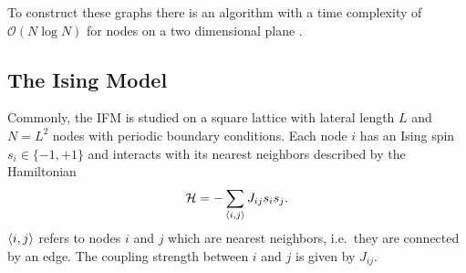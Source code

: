     To construct these graphs there is an algorithm with
    a time complexity of \(\mathcal{O}(N \log N)\) for nodes on a two
    dimensional plane \cite{RNGCell}.

\subsection{The Ising Model}
\label{ssec:model}
    Commonly, the IFM is studied on a square lattice with lateral length
    \(L\) and \(N=L^2\) nodes with periodic boundary conditions.
    Each node $i$ has an Ising spin \(s_i \in \{-1,+1\}\) and interacts with its
    nearest neighbors described by the Hamiltonian
    \begin{equation}
        \mathcal{H} = - \sum_{\left< i,j \right>}J_{ij}s_{i}s_{j}.
        \label{eq:hamiltonian}
    \end{equation}
    \(\left< i,j \right>\) refers to nodes \(i\) and \(j\) which are
    nearest neighbors, i.e.~they are connected by an edge.
    The coupling strength between \(i\) and \(j\) is given by
    \(J_{ij}\).

